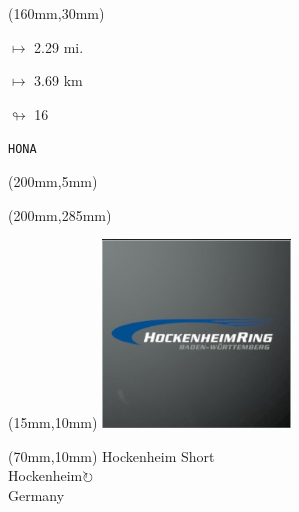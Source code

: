\begin{textblock*}{40mm}(160mm,30mm)%
\Large
\par$\mapsto$ 2.29 mi.
\par$\mapsto$ 3.69 km
\par$\looparrowright$ 16
\par\hfill\tiny\tt HONA\\
\end{textblock*}
\begin{textblock*}{20mm}(200mm,5mm)%
\fbox{\thepage}
\label{HONA}
\end{textblock*}
\begin{textblock*}{20mm}(200mm,285mm)%
\fbox{\thepage}
\end{textblock*}

\null\newpage
\begin{textblock*}{50mm}(15mm,10mm)%
\includegraphics[width=50mm]{LG/2015-05-20_00082.png}
\end{textblock*}
\begin{textblock*}{130mm}(70mm,10mm)%
{\fontsize{20}{20}\selectfont Hockenheim Short\\}
{\fontsize{16}{16}\selectfont Hockenheim\hfill \Large$\circlearrowright$\\}
{\fontsize{12}{12}\selectfont Germany\\}
\end{textblock*}
